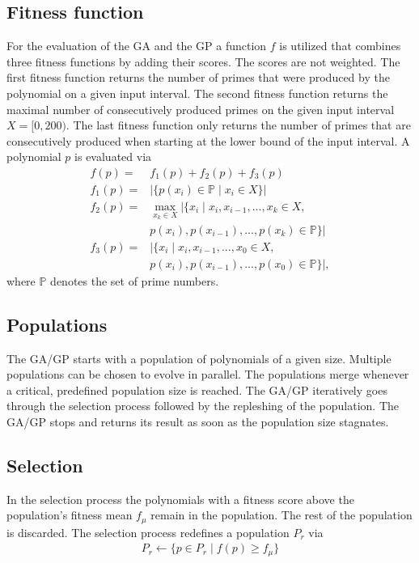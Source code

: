 \documentclass[11pt,a4paper]{article}
\begin{document}
\subsection*{Fitness function}
For the evaluation of the GA and the GP a function $f$ is utilized that combines three fitness functions by adding their scores. The scores are not weighted. The first fitness function returns the number of primes that were produced by the polynomial on a given input interval. The second fitness function returns the maximal number of consecutively produced primes on the given input interval $X = [0, 200)$. The last fitness function only returns the number of primes that are consecutively produced when starting at the lower bound of the input interval. A polynomial $p$ is evaluated via
\begin{align*}
f(p) = &f_1(p)+f_2(p)+f_3(p) \\
f_1(p) = &|\{p(x_i) \in \mathbb{P} \; | \; x_i \in X \}| \\
f_2(p) = &\max_{x_k \in X}|\{x_{i} \; | \; x_{i}, x_{i-1}, ..., x_k \in X, \\ & p(x_{i}), p(x_{i-1}), ..., p(x_k) \in \mathbb{P} \}| \\
f_3(p) = &|\{x_{i} \; | \; x_{i}, x_{i-1}, ..., x_0 \in X, \\ & p(x_{i}), p(x_{i-1}), ..., p(x_0) \in \mathbb{P} \}|,
\end{align*}
where $\mathbb{P}$ denotes the set of prime numbers.
\subsection*{Populations}
The GA/GP starts with a population of polynomials of a given size. Multiple populations can be chosen to evolve in parallel. The populations merge whenever a critical, predefined population size is reached. The GA/GP iteratively goes through the selection process followed by the repleshing of the population. The GA/GP stops and returns its result as soon as the population size stagnates.
\subsection*{Selection}
In the selection process the polynomials with a fitness score above the population's fitness mean $f_{\mu}$ remain in the population. The rest of the population is discarded. The selection process redefines a population $P_r$ via
\begin{align*}
P_r \leftarrow \{p \in P_r \; | \; f(p) \geq f_{\mu}\}
\end{align*}
\end{document}
